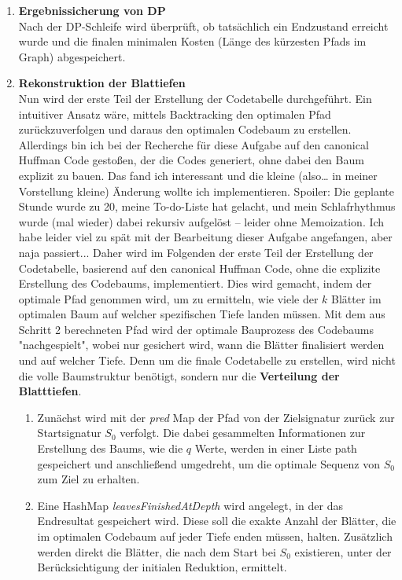 \documentclass[a4paper,10pt,ngerman]{scrartcl}
\begin{document}
\begin{enumerate}
\begin{enumerate}
  \end{enumerate}
  \item \textbf{Ergebnissicherung von DP}\\
  Nach der DP-Schleife wird überprüft, ob tatsächlich ein Endzustand erreicht wurde und die finalen minimalen Kosten (Länge des kürzesten Pfads im Graph) abgespeichert. 
  \item \textbf{Rekonstruktion der Blattiefen}\\
  Nun wird der erste Teil der Erstellung der Codetabelle durchgeführt. Ein intuitiver Ansatz wäre, mittels Backtracking den optimalen Pfad zurückzuverfolgen und daraus den optimalen Codebaum zu erstellen. Allerdings bin ich bei der Recherche für diese Aufgabe auf den canonical Huffman Code gestoßen, der die Codes generiert, ohne dabei den Baum explizit zu bauen. Das fand ich interessant und die kleine (also… in meiner Vorstellung kleine) Änderung wollte ich implementieren. Spoiler: Die geplante Stunde wurde zu 20, meine To-do-Liste hat gelacht, und mein Schlafrhythmus wurde (mal wieder) dabei rekursiv aufgelöst – leider ohne Memoization. Ich habe leider viel zu spät mit der Bearbeitung dieser Aufgabe angefangen, aber naja passiert... Daher wird im Folgenden der erste Teil der Erstellung der Codetabelle, basierend auf den canonical Huffman Code, ohne die explizite Erstellung des Codebaums, implementiert. Dies wird gemacht, indem der optimale Pfad genommen wird, um zu ermitteln, wie viele der $k$ Blätter im optimalen Baum auf welcher spezifischen Tiefe landen müssen. Mit dem aus Schritt 2 berechneten Pfad wird der optimale Bauprozess des Codebaums "nachgespielt", wobei nur gesichert wird, wann die Blätter finalisiert werden und auf welcher Tiefe. Denn um die finale Codetabelle zu erstellen, wird nicht die volle Baumstruktur benötigt, sondern nur die \textbf{Verteilung der Blatttiefen}.  
  \begin{enumerate}
    \item Zunächst wird mit der \textit{pred} Map der Pfad von der Zielsignatur zurück zur Startsignatur $S_0$ verfolgt. Die dabei gesammelten Informationen zur Erstellung des Baums, wie die $q$ Werte, werden in einer Liste path gespeichert und anschließend umgedreht, um die optimale Sequenz von $S_0$ zum Ziel zu erhalten. 
    \item Eine HashMap \textit{leavesFinishedAtDepth} wird angelegt, in der das Endresultat gespeichert wird. Diese soll die exakte Anzahl der Blätter, die im optimalen Codebaum auf jeder Tiefe enden müssen, halten. Zusätzlich werden direkt die Blätter, die nach dem Start bei $S_0$ existieren, unter der Berücksichtigung der initialen Reduktion, ermittelt. \\

\end{enumerate}
\end{enumerate}
\end{document}
